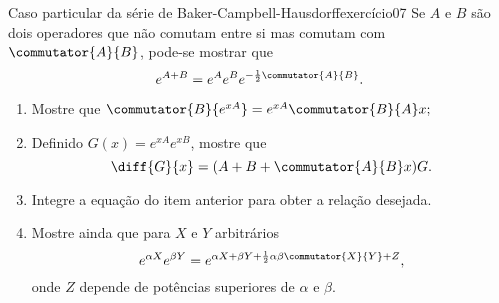 \begin{exercício}{Caso particular da série de Baker-Campbell-Hausdorff}{exercício07}
    Se \(A\) e \(B\) são dois operadores que não comutam entre si mas comutam com \(\commutator{A}{B}\), pode-se mostrar que 
    \begin{equation*}
        e^{A + B} = e^A e^B e^{-\frac12 \commutator{A}{B}}.
    \end{equation*}
    \begin{enumerate}[label=(\alph*)]
        \item Mostre que \(\commutator{B}{e^{xA}} = e^{xA} \commutator{B}{A}x;\)
        \item Definido \(G(x) = e^{xA}e^{xB}\), mostre que
            \begin{equation*}
                \diff{G}{x} = (A + B + \commutator{A}{B}x)G.
            \end{equation*}
        \item Integre a equação do item anterior para obter a relação desejada.
        \item Mostre ainda que para \(X\) e \(Y\) arbitrários
            \begin{equation*}
                e^{\alpha X} e^{\beta Y} = e^{\alpha X + \beta Y + \frac12 \alpha \beta \commutator{X}{Y} + Z},
            \end{equation*}
            onde \(Z\) depende de potências superiores de \(\alpha\) e \(\beta\).
    \end{enumerate}
\end{exercício}
